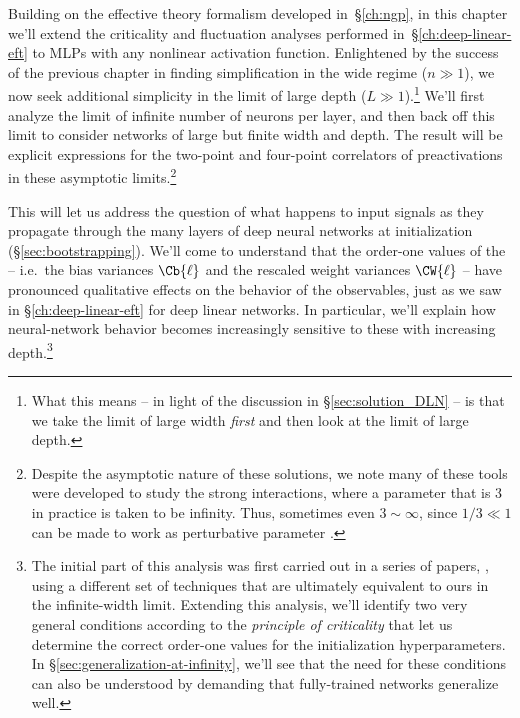 Building on the effective theory formalism developed in~\S\ref{ch:ngp}, in this chapter we'll extend the criticality and fluctuation analyses performed in~\S\ref{ch:deep-linear-eft} to MLPs with any nonlinear activation function.
Enlightened by the success of the previous chapter in finding simplification in the wide regime ($n \gg 1$), we now seek additional simplicity in the limit of large depth ($L \gg 1$).\footnote{What this means -- in light of the discussion in \S\ref{sec:solution_DLN} -- is that we take the limit of large width \emph{first} and then look at the limit of large depth.}
We'll first analyze the limit of infinite number of neurons per layer,
and then back off this limit to consider networks of large but finite width and depth. The result will be explicit expressions for the two-point and four-point correlators of preactivations in these asymptotic limits.\footnote{Despite the asymptotic nature of these solutions, we note many of these tools were developed to study the strong interactions, where a parameter that is $3$ in practice is taken to be infinity. Thus, sometimes even $3 \sim \infty$, since $1/3 \ll 1$ can be made to work as perturbative parameter \cite{Coleman:1985rnk}.
}

This will let us address the question of what happens to input signals as they propagate through the many layers of deep neural networks at initialization (\S\ref{sec:bootstrapping}).
We'll come to understand that the order-one values of the  -- i.e.~the bias variances $\Cb{\ell}$ and the rescaled weight variances $\CW{\ell}$ -- have pronounced qualitative effects on the behavior of the observables, just as we saw in \S\ref{ch:deep-linear-eft} for deep linear networks.
In particular, we'll explain how neural-network behavior becomes increasingly sensitive to these  with increasing depth.\footnote{The initial part of this analysis  was first carried out in a series of papers, \cite{poole2016exponential,raghu2017expressive,schoenholz2016deep}, using a different set of techniques that are ultimately equivalent to ours in the infinite-width limit.  Extending this analysis, we'll identify two very general  conditions according to the \emph{principle of criticality} that let us determine the correct order-one values for the initialization hyperparameters.
In \S\ref{sec:generalization-at-infinity}, we'll see that the need for these conditions can also be understood by demanding that fully-trained networks generalize well. 
}

